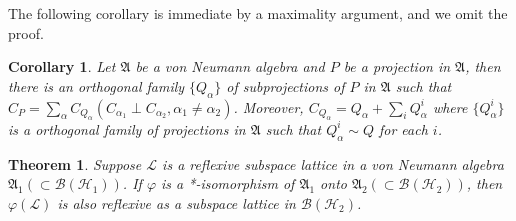 \documentclass{amsart}
\newcommand{\AAA}{\mathfrak A}
\newcommand{\B}{\mathcal B}
\newcommand{\HHH}{\mathcal H} %
\newcommand{\LLL}{\mathcal L} %
\newtheorem{theorem}{Theorem}[section]
\newtheorem{corollary}{Corollary}[section]
\begin{document}
The following corollary is immediate by a maximality argument, and we omit the proof.

\begin{corollary}\label{acor2}
Let $\AAA$ be a von Neumann algebra and $P$ be a projection in $\AAA$, then there is an orthogonal family $\{Q_{\alpha} \}$ of subprojections of $P$ in $\AAA$ such that 
$C_P = \sum_{\alpha}C_{Q_\alpha} (C_{\alpha_1} \perp C_{\alpha_2}, \alpha_1 \neq \alpha_2)$. Moreover, 
$C_{Q_\alpha} = Q_\alpha + \sum_{i}Q_{\alpha}^{i}$ where $\{Q_{\alpha}^{i} \}$ is a orthogonal family of projections in $\AAA$
such that $ Q_{\alpha}^{i} \sim Q$ for each $i$.
\end{corollary}

\begin{theorem}\label{athm2}
Suppose $\LLL$ is a reflexive subspace lattice in a von Neumann algebra $\AAA_1 (\subset \B(\HHH_1))$. If $\varphi$ is a *-isomorphism of $\AAA_1$ onto 
$\AAA_2 (\subset \B(\HHH_2))$, then $\varphi(\LLL)$ is also reflexive as a subspace lattice in $\B(\HHH_2)$.
\end{theorem}
\end{document}
